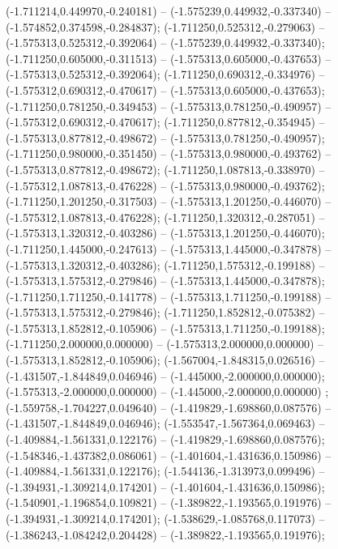  (-1.711214,0.449970,-0.240181) -- (-1.575239,0.449932,-0.337340) -- (-1.574852,0.374598,-0.284837);
 (-1.711250,0.525312,-0.279063) -- (-1.575313,0.525312,-0.392064) -- (-1.575239,0.449932,-0.337340);
 (-1.711250,0.605000,-0.311513) -- (-1.575313,0.605000,-0.437653) -- (-1.575313,0.525312,-0.392064);
 (-1.711250,0.690312,-0.334976) -- (-1.575312,0.690312,-0.470617) -- (-1.575313,0.605000,-0.437653);
 (-1.711250,0.781250,-0.349453) -- (-1.575313,0.781250,-0.490957) -- (-1.575312,0.690312,-0.470617);
 (-1.711250,0.877812,-0.354945) -- (-1.575313,0.877812,-0.498672) -- (-1.575313,0.781250,-0.490957);
 (-1.711250,0.980000,-0.351450) -- (-1.575313,0.980000,-0.493762) -- (-1.575313,0.877812,-0.498672);
 (-1.711250,1.087813,-0.338970) -- (-1.575312,1.087813,-0.476228) -- (-1.575313,0.980000,-0.493762);
 (-1.711250,1.201250,-0.317503) -- (-1.575313,1.201250,-0.446070) -- (-1.575312,1.087813,-0.476228);
 (-1.711250,1.320312,-0.287051) -- (-1.575313,1.320312,-0.403286) -- (-1.575313,1.201250,-0.446070);
 (-1.711250,1.445000,-0.247613) -- (-1.575313,1.445000,-0.347878) -- (-1.575313,1.320312,-0.403286);
 (-1.711250,1.575312,-0.199188) -- (-1.575313,1.575312,-0.279846) -- (-1.575313,1.445000,-0.347878);
 (-1.711250,1.711250,-0.141778) -- (-1.575313,1.711250,-0.199188) -- (-1.575313,1.575312,-0.279846);
 (-1.711250,1.852812,-0.075382) -- (-1.575313,1.852812,-0.105906) -- (-1.575313,1.711250,-0.199188);
 (-1.711250,2.000000,0.000000) -- (-1.575313,2.000000,0.000000) -- (-1.575313,1.852812,-0.105906);
 (-1.567004,-1.848315,0.026516) -- (-1.431507,-1.844849,0.046946) -- (-1.445000,-2.000000,0.000000);
 (-1.575313,-2.000000,0.000000) -- (-1.445000,-2.000000,0.000000) ;
 (-1.559758,-1.704227,0.049640) -- (-1.419829,-1.698860,0.087576) -- (-1.431507,-1.844849,0.046946);
 (-1.553547,-1.567364,0.069463) -- (-1.409884,-1.561331,0.122176) -- (-1.419829,-1.698860,0.087576);
 (-1.548346,-1.437382,0.086061) -- (-1.401604,-1.431636,0.150986) -- (-1.409884,-1.561331,0.122176);
 (-1.544136,-1.313973,0.099496) -- (-1.394931,-1.309214,0.174201) -- (-1.401604,-1.431636,0.150986);
 (-1.540901,-1.196854,0.109821) -- (-1.389822,-1.193565,0.191976) -- (-1.394931,-1.309214,0.174201);
 (-1.538629,-1.085768,0.117073) -- (-1.386243,-1.084242,0.204428) -- (-1.389822,-1.193565,0.191976);
